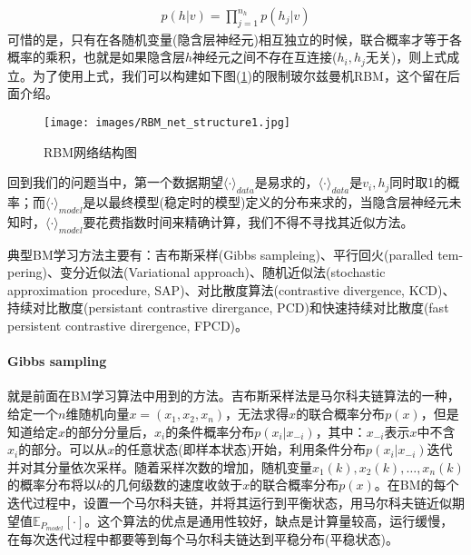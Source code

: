             \begin{align*}
            p(h|v) = \prod_{j=1}^{n_h}p(h_j|v)
            \end{align*}
            可惜的是，只有在各随机变量(隐含层神经元)相互独立的时候，联合概率才等于各概率的乘积，也就是如果隐含层$h$神经元之间不存在互连接($h_i,h_j$无关)，则上式成立。为了使用上式，我们可以构建如下图(\ref{fig:RBM网络结构图1})的限制玻尔兹曼机RBM，这个留在后面介绍。
            \begin{figure}[H]
            \centering
            \texttt{[image: images/RBM\_net\_structure1.jpg]}
            \caption{RBM网络结构图}
            \label{fig:RBM网络结构图1}
            \end{figure}
            \par
            回到我们的问题当中，第一个数据期望$\langle\cdot\rangle_{data}$是易求的，$\langle\cdot\rangle_{data}$是$v_i,h_j$同时取1的概率；而$\langle\cdot\rangle_{model}$是以最终模型(稳定时的模型)定义的分布来求的，当隐含层神经元未知时，$\langle\cdot\rangle_{model}$要花费指数时间来精确计算，我们不得不寻找其近似方法。
            \par
            典型BM学习方法主要有：吉布斯采样(Gibbs sampleing)、平行回火(paralled tem-pering)、变分近似法(Variational approach)、随机近似法(stochastic approximation procedure, SAP)、对比散度算法(contrastive divergence, KCD)、持续对比散度(persistant contrastive dirergance, PCD)和快速持续对比散度(fast persistent contrastive dirergence, FPCD)。
            \paragraph{Gibbs sampling}就是前面在BM学习算法中用到的方法。吉布斯采样法是马尔科夫链算法的一种，给定一个$n$维随机向量$x=(x_1,x_2,x_n)$，无法求得$x$的联合概率分布$p(x)$，但是知道给定$x$的部分分量后，$x_i$的条件概率分布$p(x_i|x_{-i})$，其中：$x_{-i}$表示$x$中不含$x_i$的部分。可以从$x$的任意状态(即样本状态)开始，利用条件分布$p(x_i|x_{-i})$迭代并对其分量依次采样。随着采样次数的增加，随机变量$x_1(k),x_2(k),\dots,x_n(k)$的概率分布将以$k$的几何级数的速度收敛于$x$的联合概率分布$p(x)$。在BM的每个迭代过程中，设置一个马尔科夫链，并将其运行到平衡状态，用马尔科夫链近似期望值$\mathbb{E}_{P_{model}}[\cdot]$。这个算法的优点是通用性较好，缺点是计算量较高，运行缓慢，在每次迭代过程中都要等到每个马尔科夫链达到平稳分布(平稳状态)。
